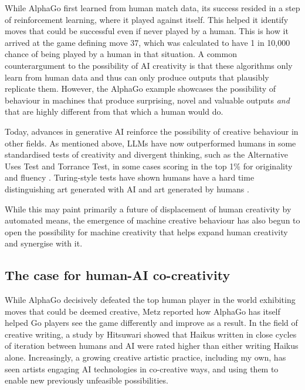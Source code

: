While AlphaGo first learned from human match data, its success resided in a step of reinforcement learning, where it played against itself. This helped it identify moves that could be successful even if never played by a human. This is how it arrived at the game defining move 37, which was calculated to have 1 in 10,000 chance of being played by a human in that situation. A common counterargument to the possibility of AI creativity is that these algorithms only learn from human data and thus can only produce outputs that plausibly replicate them. However, the AlphaGo example showcases the possibility of behaviour in machines that produce surprising, novel and valuable outputs \textit{and} that are highly different from that which a human would do.

Today, advances in generative AI reinforce the possibility of creative behaviour in other fields. As mentioned above, LLMs have now outperformed humans in some standardised tests of creativity and divergent thinking, such as the Alternative Uses Test and Torrance Test, in some cases scoring in the top 1\% for originality and fluency \cite{Hubert2024-kv, Guzik2023-cl, Koivisto2023-lw}. Turing-style tests have shown humans have a hard time distinguishing art generated with AI and art generated by humans \cite{Alexander2024-pz}. 

While this may paint primarily a future of displacement of human creativity by automated means, the emergence of machine creative behaviour has also begun to open the possibility for machine creativity that helps expand human creativity and synergise with it. 

\subsection{The case for human-AI co-creativity}

While AlphaGo decisively defeated the top human player in the world exhibiting moves that could be deemed creative, Metz \cite{Metz2016-dm} reported how AlphaGo has itself helped Go players see the game differently and improve as a result. In the field of creative writing, a study by Hitsuwari \cite{Hitsuwari2023-tw} showed that Haikus written in close cycles of iteration between humans and AI were rated higher than either writing Haikus alone. Increasingly, a growing creative artistic practice, including my own, has seen artists engaging AI technologies in co-creative ways, and using them to enable new previously unfeasible possibilities. 

